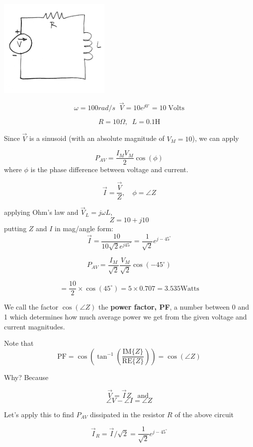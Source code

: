 \includegraphics[width=0.4\textwidth]{figsChapt03/TU95372.png}


\[
\omega = 100 rad/s\;\; \vec{V} = 10 e^{j 0^\circ} = 10\; \mathrm{Volts}
\]

\[
R = 10 \Omega,\;\; L = 0.1 \text{H}
\]

\noindent Since $\vec V$ is a sinusoid (with an absolute magnitude of
$V_M=10$), we can apply

\[
P_{AV} = \frac{I_M V_M}{2} \cos(\phi)
\]
where $\phi$ is the phase difference between voltage  and current.

\[
\vec{I} = \frac{\vec{V}}{Z},  \quad \phi = \angle{Z}
\]

applying Ohm's law and $\vec V_L = j\omega L$,
\[
Z = 10 + j10
\]
putting $Z$ and $I$ in mag/angle form:
\[
\vec{I} = \frac{10}{10\sqrt{2} e^{j45^\circ}} = \frac{1}{\sqrt{2}} e^{j-45^\circ}
\]

\[
P_{AV} = \frac{I_M}{\sqrt{2}} \frac{V_M}{\sqrt{2}}  \cos(-45^\circ )
\]

\[
= \frac{10}{2 }   \times \cos(45^\circ) = 5\times0.707 = 3.535 \text{Watts}
\]

We call the factor $\cos(\angle Z)$ the {\bf power factor, PF}, a number
between 0 and 1 which determines how much average power we get from the
given voltage and current magnitudes.

Note that
\[
\mathrm{PF} = \cos\left(\tan^{-1}\left ( \frac {\mathrm{IM}\{Z\} }  {\mathrm{RE}\{Z\}}  \right ) \right) = \cos\left ( \angle{Z}\right )
\]
%
%
%

\noindent Why?  Because

\[
\vec{V} = \vec{I} Z\;\; \text{ and }
\]
\[
\angle V - \angle I = \angle Z
\]

Let's apply this to
find $P_{AV}$ dissipated in the resistor $R$ of the above circuit

\[
\vec{I}_R = \vec{I}/\sqrt{2} = \frac{1}{\sqrt{2}} e^{j-45^\circ}
\]

